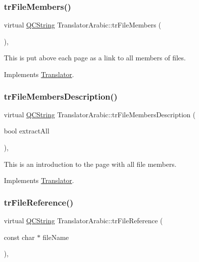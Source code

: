 \subsubsection{\texorpdfstring{trFileMembers()}{trFileMembers()}}
{\footnotesize\ttfamily virtual \mbox{\hyperlink{class_q_c_string}{Q\+C\+String}} Translator\+Arabic\+::tr\+File\+Members (\begin{DoxyParamCaption}{ }\end{DoxyParamCaption})\hspace{0.3cm}{\ttfamily [inline]}, {\ttfamily [virtual]}}

This is put above each page as a link to all members of files. 

Implements \mbox{\hyperlink{class_translator}{Translator}}.

\mbox{\label{class_translator_arabic_aae7474617581eb79f4fa74169210fc5e}} 
\subsubsection{\texorpdfstring{trFileMembersDescription()}{trFileMembersDescription()}}
{\footnotesize\ttfamily virtual \mbox{\hyperlink{class_q_c_string}{Q\+C\+String}} Translator\+Arabic\+::tr\+File\+Members\+Description (\begin{DoxyParamCaption}\item[{bool}]{extract\+All }\end{DoxyParamCaption})\hspace{0.3cm}{\ttfamily [inline]}, {\ttfamily [virtual]}}

This is an introduction to the page with all file members. 

Implements \mbox{\hyperlink{class_translator}{Translator}}.

\mbox{\label{class_translator_arabic_aa2eb3e4f87da52248ea4f8f02999c902}} 
\subsubsection{\texorpdfstring{trFileReference()}{trFileReference()}}
{\footnotesize\ttfamily virtual \mbox{\hyperlink{class_q_c_string}{Q\+C\+String}} Translator\+Arabic\+::tr\+File\+Reference (\begin{DoxyParamCaption}\item[{const char $\ast$}]{file\+Name }\end{DoxyParamCaption})\hspace{0.3cm}{\ttfamily [inline]}, {\ttfamily [virtual]}}

